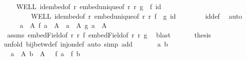 \begin{isabellebody}
\ \ \isamarkupfalse%
\ WELL\ id{\isacharunderscore}{\kern0pt}embed{\isacharbrackleft}{\kern0pt}of\ r{\isacharbrackright}{\kern0pt}\ embed{\isacharunderscore}{\kern0pt}unique{\isacharbrackleft}{\kern0pt}of\ r\ r\ {\isachardoublequoteopen}g\ {\isasymcirc}\ f{\isachardoublequoteclose}\ id{\isacharbrackright}{\kern0pt}\isanewline
\ \ \ \ \ \ \ \ WELL{\isacharprime}{\kern0pt}\ id{\isacharunderscore}{\kern0pt}embed{\isacharbrackleft}{\kern0pt}of\ r{\isacharprime}{\kern0pt}{\isacharbrackright}{\kern0pt}\ embed{\isacharunderscore}{\kern0pt}unique{\isacharbrackleft}{\kern0pt}of\ r{\isacharprime}{\kern0pt}\ r{\isacharprime}{\kern0pt}\ {\isachardoublequoteopen}f\ {\isasymcirc}\ g{\isachardoublequoteclose}\ id{\isacharbrackright}{\kern0pt}\isanewline
\ \ \ \ \ \ \ \ id{\isacharunderscore}{\kern0pt}def\ \isamarkupfalse%
\ auto\isanewline
\ \ \isamarkupfalse%
\ {}{\isacharcolon}{\kern0pt}\ {\isachardoublequoteopen}{\isacharparenleft}{\kern0pt}{\isasymforall}a\ {\isasymin}\ {\isacharquery}{\kern0pt}A{\isachardot}{\kern0pt}\ f\ a\ {\isasymin}\ {\isacharquery}{\kern0pt}A{\isacharprime}{\kern0pt}{\isacharparenright}{\kern0pt}\ {\isasymand}\ {\isacharparenleft}{\kern0pt}{\isasymforall}a{\isacharprime}{\kern0pt}\ {\isasymin}\ {\isacharquery}{\kern0pt}A{\isacharprime}{\kern0pt}{\isachardot}{\kern0pt}\ g\ a{\isacharprime}{\kern0pt}\ {\isasymin}\ {\isacharquery}{\kern0pt}A{\isacharparenright}{\kern0pt}{\isachardoublequoteclose}\isanewline
\ \ \isamarkupfalse%
\ assms\ embed{\isacharunderscore}{\kern0pt}Field{\isacharbrackleft}{\kern0pt}of\ r\ r{\isacharprime}{\kern0pt}\ f{\isacharbrackright}{\kern0pt}\ embed{\isacharunderscore}{\kern0pt}Field{\isacharbrackleft}{\kern0pt}of\ r{\isacharprime}{\kern0pt}\ r\ g{\isacharbrackright}{\kern0pt}\ \isamarkupfalse%
\ blast\isanewline
\ \ \isanewline
\ \ \isamarkupfalse%
\ {\isacharquery}{\kern0pt}thesis\isanewline
\ \ \isamarkupfalse%
{\isacharparenleft}{\kern0pt}unfold\ bij{\isacharunderscore}{\kern0pt}betw{\isacharunderscore}{\kern0pt}def\ inj{\isacharunderscore}{\kern0pt}on{\isacharunderscore}{\kern0pt}def{\isacharcomma}{\kern0pt}\ auto\ simp\ add{\isacharcolon}{\kern0pt}\ {}{\isacharparenright}{\kern0pt}\isanewline
\ \ \ \ \isamarkupfalse%
\ a\ b\ \isamarkupfalse%
\ {\isacharasterisk}{\kern0pt}{\isacharcolon}{\kern0pt}\ {\isachardoublequoteopen}a\ {\isasymin}\ {\isacharquery}{\kern0pt}A{\isachardoublequoteclose}\ {\isachardoublequoteopen}b\ {\isasymin}\ {\isacharquery}{\kern0pt}A{\isachardoublequoteclose}\ \ {\isacharasterisk}{\kern0pt}{\isacharasterisk}{\kern0pt}{\isacharcolon}{\kern0pt}\ {\isachardoublequoteopen}f\ a\ {\isacharequal}{\kern0pt}\ f\ b{\isachardoublequoteclose}\isanewline

\end{isabellebody}
